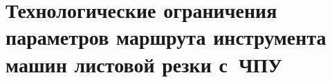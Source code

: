 
\clearpage

\section{
  Технологические ограничения параметров маршрута инструмента
  машин листовой резки с~ЧПУ
}
\label{sect:1.3}
\setcounter{equation}{0}




